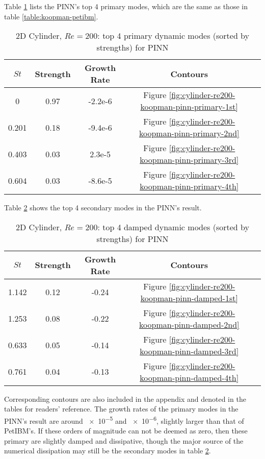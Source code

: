 Table \ref{table:koopman-pinn-primary} lists the PINN's top 4 primary modes, which are the same as those in table \ref{table:koopman-petibm}.
\begin{table}
    \begin{threeparttable}[b]
        \begin{tabular}{ccccc}
            \toprule
            $St$ & Strength & Growth Rate & Contours \\
            \midrule
            0     & 0.97 & -2.2e-6  & Figure \ref{fig:cylinder-re200-koopman-pinn-primary-1st}\\
            0.201 & 0.18 & -9.4e-6  & Figure \ref{fig:cylinder-re200-koopman-pinn-primary-2nd}\\
            0.403 & 0.03 &  2.3e-5  & Figure \ref{fig:cylinder-re200-koopman-pinn-primary-3rd}\\
            0.604 & 0.03 & -8.6e-5  & Figure \ref{fig:cylinder-re200-koopman-pinn-primary-4th}\\
            \bottomrule
        \end{tabular}%
        \caption{%
            2D Cylinder, $Re=200$: top 4 primary dynamic modes (sorted by strengths) for PINN%
        }%
        \label{table:koopman-pinn-primary}
    \end{threeparttable}
\end{table}%
Table \ref{table:koopman-pinn-damped} shows the top 4 secondary modes in the PINN's result.
\begin{table}
    \begin{threeparttable}[b]
        \begin{tabular}{ccccc}
            \toprule
            $St$ & Strength & Growth Rate & Contours \\
            \midrule
            1.142 & 0.12 & -0.24 & Figure \ref{fig:cylinder-re200-koopman-pinn-damped-1st}\\
            1.253 & 0.08 & -0.22 & Figure \ref{fig:cylinder-re200-koopman-pinn-damped-2nd}\\
            0.633 & 0.05 & -0.14 & Figure \ref{fig:cylinder-re200-koopman-pinn-damped-3rd}\\
            0.761 & 0.04 & -0.13 & Figure \ref{fig:cylinder-re200-koopman-pinn-damped-4th}\\
            \bottomrule
        \end{tabular}%
        \caption{%
            2D Cylinder, $Re=200$: top 4 damped dynamic modes (sorted by strengths) for PINN%
        }%
        \label{table:koopman-pinn-damped}
    \end{threeparttable}
\end{table}%
Corresponding contours are also included in the appendix and denoted in the tables for readers' reference.
The growth rates of the primary modes in the PINN's result are around \num{e-5} and \num{e-6}, slightly larger than that of PetIBM's.
If these orders of magnitude can not be deemed as zero, then these primary are slightly damped and dissipative, though the major source of the numerical dissipation may still be the secondary modes in table \ref{table:koopman-pinn-damped}.

